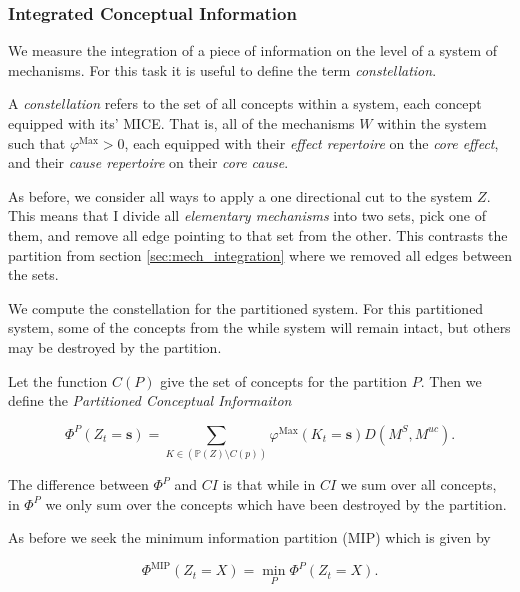 \subsubsection{Integrated Conceptual Information}
We measure the integration of a piece of information on the level of a system of mechanisms. For this task it is useful to define the term \textit{constellation}.

\begin{definition}
	A \textit{constellation} refers to the set of all concepts within a system, each concept equipped with its' MICE. That is, all of the mechanisms $W$ within the system such that $\varphi^{\text{Max}}>0$, each equipped with their \textit{effect repertoire} on the \textit{core effect}, and their \textit{cause repertoire} on their \textit{core cause}.
\end{definition}

As before, we consider all ways to apply a one directional cut to the system $Z$. This means that I divide all \textit{elementary mechanisms} into two sets, pick one of them, and remove all edge pointing to that set from the other. This contrasts the partition from section \ref{sec:mech_integration} where we removed all edges between the sets.

We compute the constellation for the partitioned system. For this partitioned system, some of the concepts from the while system will remain intact, but others may be  destroyed by the partition.

Let the function $C(P)$ give the set of concepts for the partition $P$. Then we define the \textit{Partitioned Conceptual Informaiton}

\begin{equation}
\label{def:Phi_integration1}
\Phi^P(Z_t = \mathbf{s}) = \sum \limits_{K \in (\mathbb{P}(Z) \setminus C(p))} \varphi^{\text{Max}}(K_t = \mathbf{s})D(M^S, M^{uc}).
\end{equation}

The difference between $\Phi^P$ and $CI$ is that while in $CI$ we sum over all concepts, in $\Phi^P$ we only sum over the concepts which have been destroyed by the partition.

As before we seek the minimum information partition (MIP) which is given by

\begin{equation}
\label{def:Phi_integration2}
\Phi^{\text{MIP}} (Z_t = X) = \min \limits_{P} \Phi^P(Z_t = X).
\end{equation}

